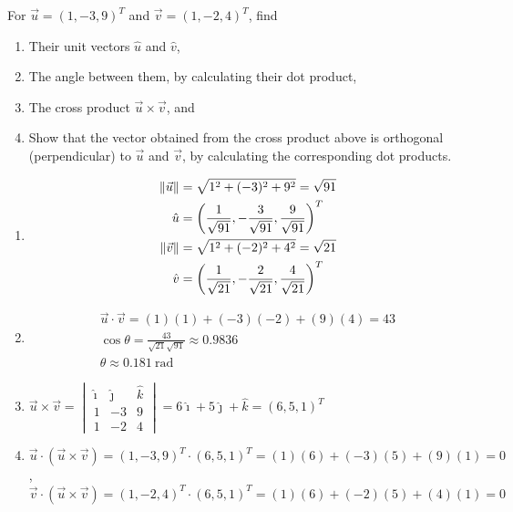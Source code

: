 \begin{Exercise}
For $\vec{u} = (1, -3, 9)^T$ and $\vec{v} = (1, -2, 4)^T$, find
\begin{enumerate}[label=(\alph*)]
\item Their unit vectors $\hat{u}$ and $\hat{v}$,
\item The angle between them, by calculating their dot product,
\item The cross product $\vec{u} \times \vec{v}$, and 
\item Show that the vector obtained from the cross product above is orthogonal (perpendicular) to $\vec{u}$ and $\vec{v}$, by calculating the corresponding dot products.
\end{enumerate}
\end{Exercise}
\begin{Answer}
\begin{enumerate}[label=(\alph*)]
\item 
\begin{align*}
\norm{\vec{u}} &= \sqrt{1^2 + (-3)^2 + 9^2} = \sqrt{91} \\
\hat{u} &= \left(\frac{1}{\sqrt{91}}, -\frac{3}{\sqrt{91}}, \frac{9}{\sqrt{91}}\right)^T \\
\norm{\vec{v}} &= \sqrt{1^2 + (-2)^2 + 4^2} = \sqrt{21} \\
\hat{v} &= \left(\frac{1}{\sqrt{21}}, -\frac{2}{\sqrt{21}}, \frac{4}{\sqrt{21}}\right)^T  
\end{align*}
\item 
\begin{align*}
\vec{u} \cdot \vec{v} = (1)(1) + (-3)(-2) + (9)(4) = 43 \\
\cos\theta = \frac{43}{\sqrt{21}\sqrt{91}} \approx 0.9836 \\
\theta \approx \SI{0.181}{\radian}    
\end{align*}
\item $\vec{u} \times \vec{v} = \begin{vmatrix}
\hat{\imath} & \hat{\jmath} & \hat{k}\\
1 & -3 & 9\\
1 & -2 & 4
\end{vmatrix}
= 6\hat{\imath} + 5\hat{\jmath} + \hat{k} = (6, 5, 1)^T$
\item $\vec{u} \cdot (\vec{u} \times \vec{v}) = (1, -3, 9)^T \cdot (6, 5, 1)^T = (1)(6) + (-3)(5) + (9)(1) = 0$, $\vec{v} \cdot (\vec{u} \times \vec{v}) = (1, -2, 4)^T \cdot (6, 5, 1)^T = (1)(6) + (-2)(5) + (4)(1) = 0$
\end{enumerate}
\end{Answer}

